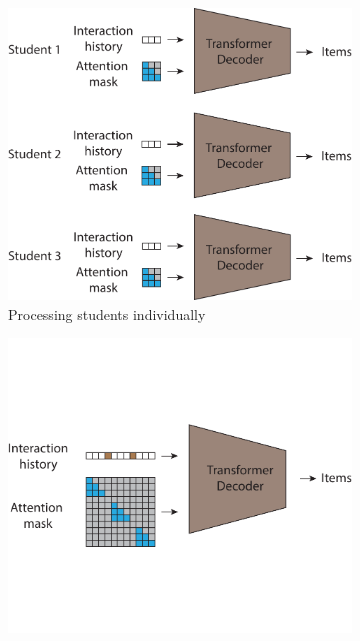 \documentclass{article}
\begin{document}
\newcommand\MultiplierIndivdual{166.33}
\newcommand\MultiplierIntermediate{165.1}
\newcommand\MultiplierKey{17}
\newcommand\MultiplierScale{0.0019\linewidth}
\begin{figure}
    \centering
    \begin{subfigure}[t]{0.31602\linewidth}
        \includegraphics[width=\linewidth]{figures/main/individual.pdf}
        \caption{Processing students individually}
    \end{subfigure}
    \hfill
    \begin{subfigure}[t]{0.3136\linewidth}
        \includegraphics[width=\linewidth]{figures/main/intermediate.pdf}

\end{subfigure}
\end{figure}
\end{document}
